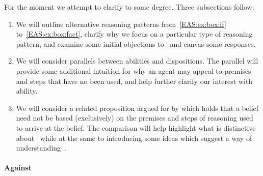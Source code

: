 \begin{note}
  For the moment we attempt to clarify \EAS{} to some degree.
  Three subsections follow:

  \begin{enumerate}
  \item We will outline alternative reasoning patterns from~\ref{EAS:ex:box:if} to~\ref{EAS:ex:box:fact}, clarify why we focus on a particular type of reasoning pattern, and examine some initial objections to~\EAS{} and canvas some responses.
  \item We will consider parallels between abilities and dispositions.
    The parallel will provide some additional intuition for why an agent may appeal to premises and steps that have no been used, and help further clarify our interest with ability.
  \item We will consider a related proposition argued for by \citeauthor{Moretti:2019wx} which holds that a belief need not be based (exclusively) on the premises and steps of reasoning used to arrive at the belief.
    The comparison will help highlight what is distinctive about~\EAS{} while at the same to introducing some ideas which suggest a way of understanding~\EAS{}.
  \end{enumerate}
\end{note}

\paragraph{Against \EAS{}}

